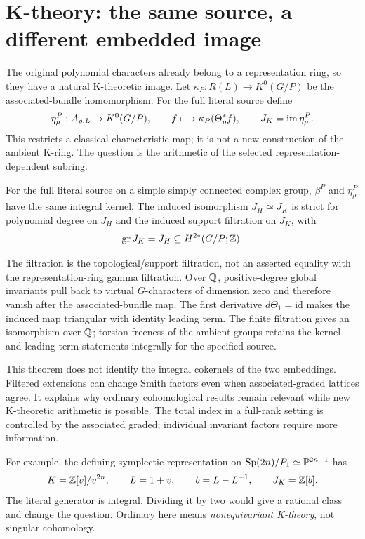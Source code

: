 \section{K-theory: the same source, a different embedded image}
The original polynomial characters already belong to a representation ring, so they have a natural K-theoretic image. Let $\kappa_P:R(L)\to K^0(G/P)$ be the associated-bundle homomorphism. For the full literal source define
\[
 \eta_\rho^P:A_{\rho,L}\to K^0(G/P),\qquad
 f\longmapsto\kappa_P(\Theta_\rho^*f),\qquad J_K=\operatorname{im}\eta_\rho^P.
\]
This restricts a classical characteristic map; it is not a new construction of the ambient K-ring. The question is the arithmetic of the selected representation-dependent subring.

\begin{theorem}
For the full literal source on a simple simply connected complex group, $\beta^P$ and $\eta_\rho^P$ have the same integral kernel. The induced isomorphism $J_H\simeq J_K$ is strict for polynomial degree on $J_H$ and the induced support filtration on $J_K$, with
\[
 \operatorname{gr}J_K=J_H\subseteq H^{2*}(G/P;\mathbb Z).
\]
\end{theorem}
The filtration is the topological/support filtration, not an asserted equality with the representation-ring gamma filtration. Over $\mathbb Q$, positive-degree global invariants pull back to virtual $G$-characters of dimension zero and therefore vanish after the associated-bundle map. The first derivative $d\Theta_1=\mathrm{id}$ makes the induced map triangular with identity leading term. The finite filtration gives an isomorphism over $\mathbb Q$; torsion-freeness of the ambient groups retains the kernel and leading-term statements integrally for the specified source.

This theorem does not identify the integral cokernels of the two embeddings. Filtered extensions can change Smith factors even when associated-graded lattices agree. It explains why ordinary cohomological results remain relevant while new K-theoretic arithmetic is possible. The total index in a full-rank setting is controlled by the associated graded; individual invariant factors require more information.

For example, the defining symplectic representation on $\operatorname{Sp}(2n)/P_1\simeq\mathbb P^{2n-1}$ has
\[
 K=\mathbb Z[v]/v^{2n},\qquad L=1+v,\qquad b=L-L^{-1},\qquad J_K=\mathbb Z[b].
\]
The literal generator is integral. Dividing it by two would give a rational class and change the question. Ordinary here means \emph{nonequivariant K-theory}, not singular cohomology.

